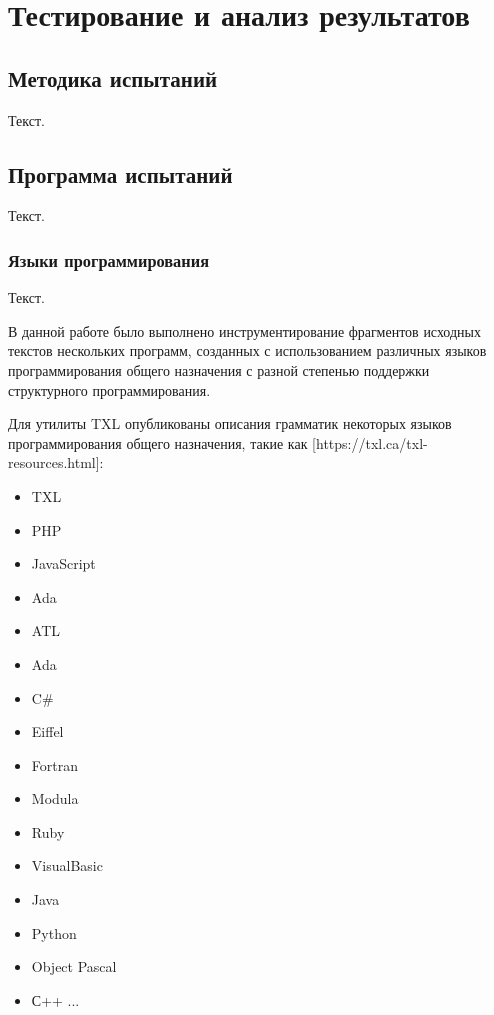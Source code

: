 \chapter{Тестирование и анализ результатов}

\section{Методика испытаний}

Текст.

\section{Программа испытаний}

Текст.

\subsection{Языки программирования}

Текст.

В данной работе было выполнено инструментирование фрагментов исходных текстов нескольких программ, созданных с использованием различных языков программирования общего назначения с разной степенью поддержки структурного программирования.

Для утилиты TXL опубликованы описания грамматик некоторых языков программирования общего назначения, такие как [https://txl.ca/txl-resources.html]:
\begin{itemize}
  \item TXL
  \item PHP
  \item JavaScript
  \item Ada
  \item ATL
  \item Ada
  \item C\#
  \item Eiffel
  \item Fortran
  \item Modula
  \item Ruby
  \item VisualBasic

  \item Java
  \item Python
  \item Object Pascal
  \item С++
  ...
\end{itemize}

